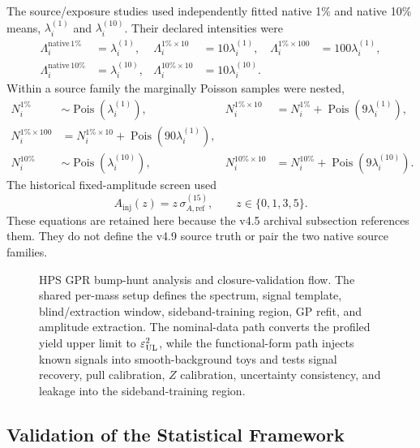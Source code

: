 The source/exposure studies used independently fitted native 1\% and native 10\%
means, $\lambda_i^{(1)}$ and $\lambda_i^{(10)}$.  Their declared intensities were
\begin{align}
\Lambda_i^{\mathrm{native}\,1\%}&=\lambda_i^{(1)}, &
\Lambda_i^{1\%\times10}&=10\lambda_i^{(1)}, &
\Lambda_i^{1\%\times100}&=100\lambda_i^{(1)},\nonumber\\
\Lambda_i^{\mathrm{native}\,10\%}&=\lambda_i^{(10)}, &
\Lambda_i^{10\%\times10}&=10\lambda_i^{(10)}.
\label{eq:v4p1-ls-pilot-scenarios}
\end{align}
Within a source family the marginally Poisson samples were nested,
\begin{align}
N_i^{1\%}&\sim\operatorname{Pois}(\lambda_i^{(1)}), &
N_i^{1\%\times10}&=N_i^{1\%}+\operatorname{Pois}(9\lambda_i^{(1)}),\nonumber\\
N_i^{1\%\times100}&=N_i^{1\%\times10}+\operatorname{Pois}(90\lambda_i^{(1)}),
\nonumber\\
N_i^{10\%}&\sim\operatorname{Pois}(\lambda_i^{(10)}), &
N_i^{10\%\times10}&=N_i^{10\%}+\operatorname{Pois}(9\lambda_i^{(10)}).
\label{eq:v4p1-ls-pilot-increments}
\end{align}
The historical fixed-amplitude screen used
\begin{equation}
A_{\mathrm{inj}}(z)=z\,\sigma_{A,\mathrm{ref}}^{(15)},
\qquad z\in\{0,1,3,5\}.
\label{eq:v4p1-fixed-amplitude-anchor}
\end{equation}
These equations are retained here because the v4.5 archival subsection references
them.  They do not define the v4.9 source truth or pair the two native source families.

\begin{figure}[H]
\centering
{}
\caption{HPS GPR bump-hunt analysis and closure-validation flow. The shared
per-mass setup defines the spectrum, signal template, blind/extraction window,
sideband-training region, GP refit, and amplitude extraction. The nominal-data path
converts the profiled yield upper limit to $\varepsilon^2_{\mathrm{UL}}$, while the
functional-form path injects known signals into smooth-background toys and tests signal
recovery, pull calibration, $Z$ calibration, uncertainty consistency, and leakage into
the sideband-training region.}
\label{fig:hps-gpr-flowchart-section5}
\end{figure}

\subsection{Validation of the Statistical Framework}

